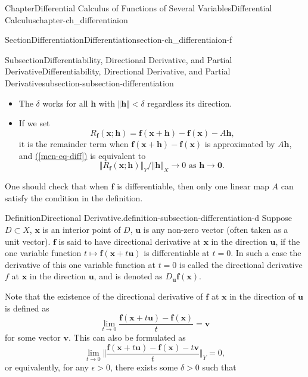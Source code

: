 \documentclass[oneside,10pt,]{book}
\newcommand{\xreffont}{\relax}
\numberwithin{equation}{section}
\newcommand{\bff}{\mathbf{f}}
\newcommand{\bh}{\mathbf{h}}
\newcommand{\bx}{\mathbf{x}}
\begin{document}
\begin{chapterptx}{Chapter}{Differential Calculus of Functions of Several Variables}{}{Differential Calculus}{}{}{chapter-ch_differentiaion}
\begin{sectionptx}{Section}{Differentiation}{}{Differentiation}{}{}{section-ch_differentiaion-f}
\begin{subsectionptx}{Subsection}{Differentiability, Directional Derivative, and Partial Derivative}{}{Differentiability, Directional Derivative, and Partial Derivative}{}{}{subsection-subsection-differentiation}
\begin{itemize}[label=\textbullet]
\item{}The \(\delta\) works for all \({\mathbf h}\) with \(\Vert {\mathbf h} \Vert < \delta\) regardless its direction.%
\item{}If we set%
\begin{equation*}
R_{\bff}(\bx; \bh)= {\mathbf f}({\mathbf x}+{\mathbf h})- {\mathbf f}({\mathbf x})-A{\mathbf h}\text{,}
\end{equation*}
it is the remainder term when \({\mathbf f}({\mathbf x}+{\mathbf h})- {\mathbf f}({\mathbf x})\) is approximated by \(A{\mathbf h}\), and \hyperref[men-eq-diff]{({\xreffont\ref{men-eq-diff}})} is equivalent to%
\begin{equation*}
\Vert R_{\bff}(\bx; \bh) \Vert_{Y}/\Vert \bh \Vert_{X}\to 0 \text{ as $\bh\to \mathbf 0$.}
\end{equation*}
%
\end{itemize}
One should check that when \(\bff\) is differentiable, then only one linear map \(A\) can satisfy the condition in the definition.%
\begin{definition}{Definition}{Directional Derivative.}{definition-subsection-differentiation-d}%
Suppose \(D\subset X\), \(\bx\) is an interior point of \(D\), \({\mathbf u}\) is any non-zero vector (often taken as a unit vector).  \({\mathbf f}\) is said to have directional derivative  at \({\mathbf x}\) in the direction \({\mathbf u}\), if  the one variable function \(t\mapsto  {\mathbf f}({\mathbf x}+t{\mathbf u})\) is differentiable at \(t=0\). In such a case the derivative of this one variable function at \(t=0\) is called the directional derivative  \(f\) at \({\mathbf x}\) in the direction \({\mathbf u}\), and is denoted as \(D_{{\mathbf u}} {\mathbf f}({\mathbf x})\).\end{definition}
Note that the existence of the directional derivative of \(\bff\) at \(\bx\) in the direction  of \({\mathbf u}\) is defined as%
\begin{equation*}
\lim_{t\to 0}
\frac{ {\mathbf f}({\mathbf x}+t{\mathbf u})- {\mathbf f}({\mathbf x})}{t}={\mathbf v}
\end{equation*}
for some vector \({\mathbf v}\). This can also be formulated as%
\begin{equation*}
\lim_{t\to 0}
\Vert \frac{ {\mathbf f}({\mathbf x}+t{\mathbf u})- {\mathbf f}({\mathbf x})-t {\mathbf v} }{t} \Vert_{Y}=0,
\end{equation*}
or equivalently, for any \(\epsilon >0\), there exists some \(\delta>0\) such that%
\begin{equation*}

\end{equation*}
\end{subsectionptx}
\end{sectionptx}
\end{chapterptx}
\end{document}
